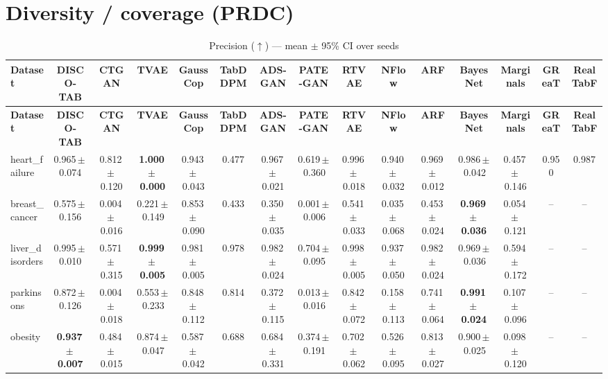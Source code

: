 \documentclass[8pt]{extarticle}
\begin{document}
\section*{Diversity / coverage (PRDC)}
\begin{longtable}{l*{14}{c}}
\caption{Precision ($\uparrow$) --- mean $\pm$ 95\% CI over seeds}\\
\toprule
\textbf{Dataset} & \textbf{DISCO-TAB} & \textbf{CTGAN} & \textbf{TVAE} & \textbf{GaussCop} & \textbf{TabDDPM} & \textbf{ADS-GAN} & \textbf{PATE-GAN} & \textbf{RTVAE} & \textbf{NFlow} & \textbf{ARF} & \textbf{BayesNet} & \textbf{Marginals} & \textbf{GReaT} & \textbf{RealTabF} \\
\midrule
\endfirsthead
\toprule
\textbf{Dataset} & \textbf{DISCO-TAB} & \textbf{CTGAN} & \textbf{TVAE} & \textbf{GaussCop} & \textbf{TabDDPM} & \textbf{ADS-GAN} & \textbf{PATE-GAN} & \textbf{RTVAE} & \textbf{NFlow} & \textbf{ARF} & \textbf{BayesNet} & \textbf{Marginals} & \textbf{GReaT} & \textbf{RealTabF} \\
\midrule
\endhead
\bottomrule
\endfoot
heart\_failure & 0.965\,$\pm$\,0.074 & 0.812\,$\pm$\,0.120 & \textbf{1.000\,$\pm$\,0.000} & 0.943\,$\pm$\,0.043 & 0.477 & 0.967\,$\pm$\,0.021 & 0.619\,$\pm$\,0.360 & 0.996\,$\pm$\,0.018 & 0.940\,$\pm$\,0.032 & 0.969\,$\pm$\,0.012 & 0.986\,$\pm$\,0.042 & 0.457\,$\pm$\,0.146 & 0.950 & 0.987 \\
breast\_cancer & 0.575\,$\pm$\,0.156 & 0.004\,$\pm$\,0.016 & 0.221\,$\pm$\,0.149 & 0.853\,$\pm$\,0.090 & 0.433 & 0.350\,$\pm$\,0.035 & 0.001\,$\pm$\,0.006 & 0.541\,$\pm$\,0.033 & 0.035\,$\pm$\,0.068 & 0.453\,$\pm$\,0.024 & \textbf{0.969\,$\pm$\,0.036} & 0.054\,$\pm$\,0.121 & -- & -- \\
liver\_disorders & 0.995\,$\pm$\,0.010 & 0.571\,$\pm$\,0.315 & \textbf{0.999\,$\pm$\,0.005} & 0.981\,$\pm$\,0.005 & 0.978 & 0.982\,$\pm$\,0.024 & 0.704\,$\pm$\,0.095 & 0.998\,$\pm$\,0.005 & 0.937\,$\pm$\,0.050 & 0.982\,$\pm$\,0.024 & 0.969\,$\pm$\,0.036 & 0.594\,$\pm$\,0.172 & -- & -- \\
parkinsons & 0.872\,$\pm$\,0.126 & 0.004\,$\pm$\,0.018 & 0.553\,$\pm$\,0.233 & 0.848\,$\pm$\,0.112 & 0.814 & 0.372\,$\pm$\,0.115 & 0.013\,$\pm$\,0.016 & 0.842\,$\pm$\,0.072 & 0.158\,$\pm$\,0.113 & 0.741\,$\pm$\,0.064 & \textbf{0.991\,$\pm$\,0.024} & 0.107\,$\pm$\,0.096 & -- & -- \\
obesity & \textbf{0.937\,$\pm$\,0.007} & 0.484\,$\pm$\,0.015 & 0.874\,$\pm$\,0.047 & 0.587\,$\pm$\,0.042 & 0.688 & 0.684\,$\pm$\,0.331 & 0.374\,$\pm$\,0.191 & 0.702\,$\pm$\,0.062 & 0.526\,$\pm$\,0.095 & 0.813\,$\pm$\,0.027 & 0.900\,$\pm$\,0.025 & 0.098\,$\pm$\,0.120 & -- & -- \\

\end{longtable}
\end{document}
